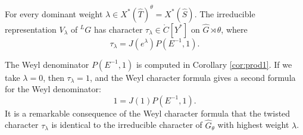 \begin{theorem}  For every dominant weight $\lambda\in X^*(\hat T)^\theta = X^*(\hat S)$.
The irreducible representation $V_\lambda$ of ${}^LG$ has character $\tau_\lambda\in \ring{C}[Y^*]$ on
$\hat G\rtimes \theta$, where
\[
\tau_\lambda = J(e^\lambda) P(E^{-1},1).
\]
\end{theorem}


The Weyl denominator $P(E^{-1},1)$ is computed in Corollary \ref{cor:prod1}.  
If we take $\lambda=0$, then $\tau_\lambda=1$, and the Weyl character formula gives 
a second formula for the Weyl denominator:
\begin{equation}\label{eqn:wd2}
1= J(1) P(E^{-1},1).
\end{equation}
It is a remarkable consequence
of the Weyl character formula that
the twisted character $\tau_\lambda$ is identical to the irreducible character of 
$\hat G_\theta$ with highest weight $\lambda$.



